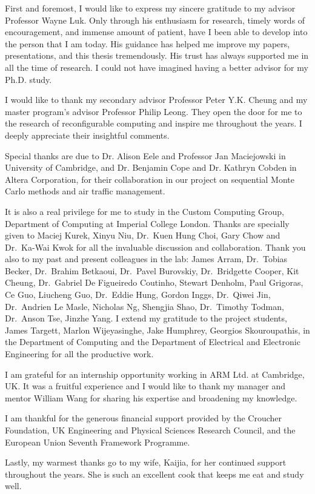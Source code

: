 
\cleardoublepage

{}

\begin{acknowledgements}

First and foremost, I would like to express my sincere gratitude to my advisor Professor Wayne Luk.
Only through his enthusiasm for research, timely words of encouragement, and immense amount of patient, have I been able to develop into the person that I am today.
His guidance has helped me improve my papers, presentations, and this thesis tremendously.
His trust has always supported me in all the time of research.
I could not have imagined having a better advisor for my Ph.D. study.

I would like to thank my secondary advisor Professor Peter Y.K. Cheung and my master program's advisor Professor Philip Leong.
They open the door for me to the research of reconfigurable computing and inspire me throughout the years.
I deeply appreciate their insightful comments.

Special thanks are due to Dr. Alison Eele and Professor Jan Maciejowski in University of Cambridge, and Dr. Benjamin Cope and Dr. Kathryn Cobden in Altera Corporation, for their collaboration in our project on sequential Monte Carlo methods and air traffic management.

It is also a real privilege for me to study in the Custom Computing Group, Department of Computing at Imperial College London.
Thanks are specially given to Maciej Kurek, Xinyu Niu, Dr.~Kuen Hung Choi, Gary Chow and Dr.~Ka-Wai Kwok for all the invaluable discussion and collaboration.
Thank you also to my past and present colleagues in the lab: James Arram, Dr.~Tobias Becker, Dr.~Brahim Betkaoui, Dr.~Pavel Burovskiy, Dr.~Bridgette Cooper, Kit Cheung, Dr.~Gabriel De Figueiredo Coutinho, Stewart Denholm, Paul Grigoras, Ce Guo, Liucheng Guo, Dr.~Eddie Hung, Gordon Inggs, Dr.~Qiwei Jin, Dr.~Andrien Le Masle, Nicholas Ng, Shengjia Shao, Dr.~Timothy Todman, Dr.~Anson Tse, Jinzhe Yang.
I extend my gratitude to the project students, James Targett, Marlon Wijeyasinghe, Jake Humphrey, Georgios Skouroupathis, in the Department of Computing and the Department of Electrical and Electronic Engineering for all the productive work.

I am grateful for an internship opportunity working in ARM Ltd. at Cambridge, UK.
It was a fruitful experience and I would like to thank my manager and mentor William Wang for sharing his expertise and broadening my knowledge.

I am thankful for the generous financial support provided by the Croucher Foundation, UK Engineering and Physical Sciences Research Council, and the European Union Seventh Framework Programme.

Lastly, my warmest thanks go to my wife, Kaijia, for her continued support throughout the years.
She is such an excellent cook that keeps me eat and study well.

\end{acknowledgements}
